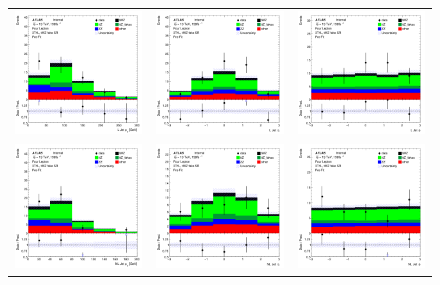 \begin{figure}[htbp]
  \begin{tabular}{ccc}

    \includegraphics[width=.3\textwidth]{figures/PreFitPlots/lep4_tWZ_3T1L_LJet_pt.png} &
    \includegraphics[width=.3\textwidth]{figures/PreFitPlots/lep4_tWZ_3T1L_LJet_eta.png} &
    \includegraphics[width=.3\textwidth]{figures/PreFitPlots/lep4_tWZ_3T1L_LJet_phi.png} \\
    \includegraphics[width=.3\textwidth]{figures/PreFitPlots/lep4_tWZ_3T1L_NLJet_pt.png} &
    \includegraphics[width=.3\textwidth]{figures/PreFitPlots/lep4_tWZ_3T1L_NLJet_eta.png} &
    \includegraphics[width=.3\textwidth]{figures/PreFitPlots/lep4_tWZ_3T1L_NLJet_phi.png} \\


\end{tabular}
\end{figure}
